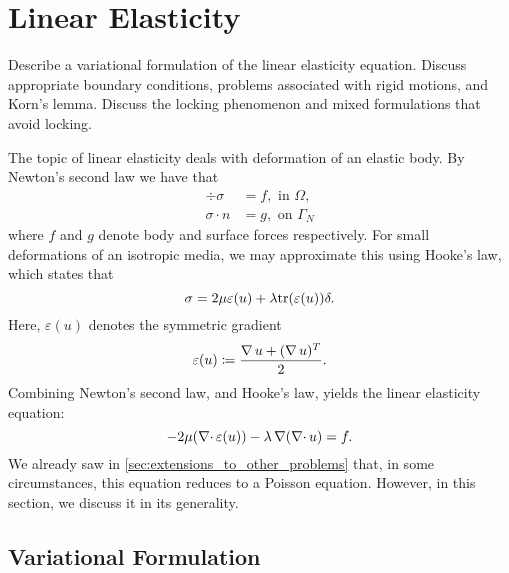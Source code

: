 \chapter{Linear Elasticity}

\begin{problem_text}
    Describe a variational formulation of the linear elasticity equation.
    Discuss appropriate boundary conditions, problems associated with rigid
    motions, and Korn's lemma. Discuss the locking phenomenon and mixed
    formulations that avoid locking.
\end{problem_text}

The topic of linear elasticity deals with deformation of an elastic body.
By Newton's second law we have that
\begin{align}
    \div \sigma &= f, \text{ in } \Omega,\\
    \sigma \cdot n &= g, \text{ on } \Gamma_N
\end{align}
where \( f \) and \( g  \) denote body and surface forces respectively.  For
small deformations of an isotropic media, we may approximate this using Hooke's
law, which states that
\begin{equation}
\sigma = 2 \mu \varepsilon(u) + \lambda \mathrm{tr}(\varepsilon(u))\delta.
\end{equation}
Here, \( \varepsilon (u) \) denotes the symmetric gradient
\begin{equation}
    \varepsilon(u) \coloneqq \frac{\operatorname{\mathop{}\!\nabla} u + (\operatorname{\mathop{}\!\nabla} u)^T}{2}.
\end{equation}
Combining Newton's second law, and Hooke's law, yields the linear elasticity equation:
\begin{equation}
    \label{eq:linelast}
    -2\mu(\operatorname{\mathop{}\!\nabla \cdot} \varepsilon(u)) - \lambda \operatorname{\mathop{}\!\nabla}(\operatorname{\mathop{}\!\nabla \cdot} u) = f.
\end{equation}
We already saw in \vref{sec:extensions_to_other_problems} that, in some
circumstances, this equation reduces to a Poisson equation. However, in this
section, we discuss it in its generality.

\section{Variational Formulation}
\label{sec:variational_formulation}

